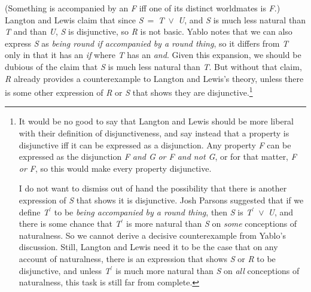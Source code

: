 \noindent (Something is accompanied by an \textit{F} iff one of its distinct worldmates is \textit{F}.) Langton and Lewis claim that since \textit{S}~=~\textit{T}~${\vee}$~\textit{U}, and \textit{S} is much less natural than \textit{T} and than \textit{U}, \textit{S} is disjunctive, so \textit{R} is not basic. Yablo notes that we can also express \textit{S} as \textit{being round if accompanied by a round thing}, so it differs from \textit{T} only in that it has an \textit{if} where \textit{T} has an \textit{and}. Given this expansion, we should be dubious of the claim that \textit{S} is much less natural than \textit{T}. But without that claim, \textit{R} already provides a counterexample to Langton and Lewis's theory, unless there is some other expression of \textit{R} or \textit{S} that shows they are disjunctive.\footnote{ It would be no good to say that Langton and Lewis should be more liberal with their definition of disjunctiveness, and say instead that a property is disjunctive iff it can be expressed as a disjunction. Any property \textit{F} can be expressed as the disjunction \textit{F} \textit{and G} \textit{or F and not G}, or for that matter, \textit{F or F}, so this would make every property disjunctive.\par I do not want to dismiss out of hand the possibility that there is another expression of \textit{S} that shows it is disjunctive. Josh Parsons suggested that if we define \textit{T}\(^\prime\) to be \textit{being accompanied by a round thing}, then \textit{S} is \textit{T}\(^\prime\)~${\vee}$~\textit{U}, and there is some chance that \textit{T}\(^\prime\) is more natural than \textit{S} on \textit{some} conceptions of naturalness. So we cannot derive a decisive counterexample from Yablo's discussion. Still, Langton and Lewis need it to be the case that on any account of naturalness, there is an expression that shows \textit{S} or \textit{R} to be disjunctive, and unless \textit{T}\(^\prime\) is much more natural than \textit{S} on \textit{all} conceptions of naturalness, this task is still far from complete.}

